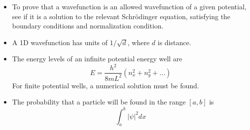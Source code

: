\documentclass{article}
\begin{document}
\begin{itemize}
        \item To prove that a wavefunction is an allowed wavefunction of a given potential, see if it is a solution to the relevant Schr\"odinger equation, satisfying the boundary conditions and normalization condition.

        \item A 1D wavefunction has units of $1/\sqrt{d}$, where $d$ is distance.

        \item The energy levels of an infinite potential energy well are
        \begin{equation*}
            E = \frac{h^2}{8mL^2}(n_x^2 + n_y^2 + \dots)
        \end{equation*}
        For finite potential wells, a numerical solution must be found.

        \item The probability that a particle will be found in the range $[a,b]$ is
        \begin{equation*}
            \int_{a}^{b} |\psi|^2 dx
        \end{equation*}
    \end{itemize}
\end{document}
